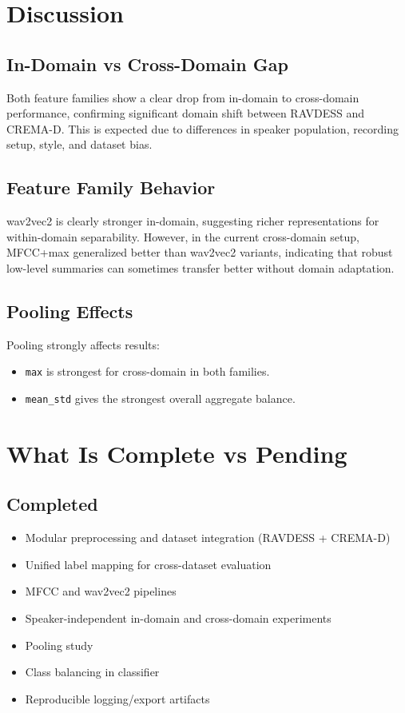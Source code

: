 \documentclass[11pt,a4paper]{article}
\begin{document}
\section{Discussion}
\subsection{In-Domain vs Cross-Domain Gap}
Both feature families show a clear drop from in-domain to cross-domain performance, confirming significant domain shift between RAVDESS and CREMA-D. This is expected due to differences in speaker population, recording setup, style, and dataset bias.

\subsection{Feature Family Behavior}
wav2vec2 is clearly stronger in-domain, suggesting richer representations for within-domain separability. However, in the current cross-domain setup, MFCC+max generalized better than wav2vec2 variants, indicating that robust low-level summaries can sometimes transfer better without domain adaptation.

\subsection{Pooling Effects}
Pooling strongly affects results:
\begin{itemize}
    \item \texttt{max} is strongest for cross-domain in both families.
    \item \texttt{mean\_std} gives the strongest overall aggregate balance.
\end{itemize}

\section{What Is Complete vs Pending}
\subsection{Completed}
\begin{itemize}
    \item Modular preprocessing and dataset integration (RAVDESS + CREMA-D)
    \item Unified label mapping for cross-dataset evaluation
    \item MFCC and wav2vec2 pipelines
    \item Speaker-independent in-domain and cross-domain experiments
    \item Pooling study
    \item Class balancing in classifier
    \item Reproducible logging/export artifacts
\end{itemize}
\end{document}
